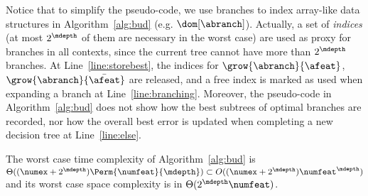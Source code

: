 \documentclass{llncs}
\begin{document}
\medskip

Notice that to simplify the pseudo-code, we use branches to index array-like data structures in Algorithm~\ref{alg:bud} (e.g. $\dom[\abranch]$). Actually, a set of \emph{indices} (at most $2^{\mdepth}$ of them are necessary in the worst case) are used as proxy for branches in all contexts, since the current tree cannot have more than $2^{\mdepth}$ branches. At Line~\ref{line:storebest}, the indices for $\grow{\abranch}{\afeat}$, $\grow{\abranch}{\bar{\afeat}}$ are released, and a free index is marked as used when expanding a branch at Line~\ref{line:branching}. Moreover, the pseudo-code in Algorithm~\ref{alg:bud} does not show how the best subtrees of optimal branches are recorded, nor how the overall best error is updated when completing a new decision tree at Line~\ref{line:else}.











		

		\begin{theorem}
			The worst case time complexity of Algorithm~\ref{alg:bud} is $\Theta((\numex+2^\mdepth){\Perm{\numfeat}{\mdepth}}) \subset O((\numex + 2^{\mdepth})\numfeat^\mdepth)$ and its worst case space complexity is in $\Theta(2^{\mdepth}\numfeat)$.
			\end{theorem}
			
\end{document}

